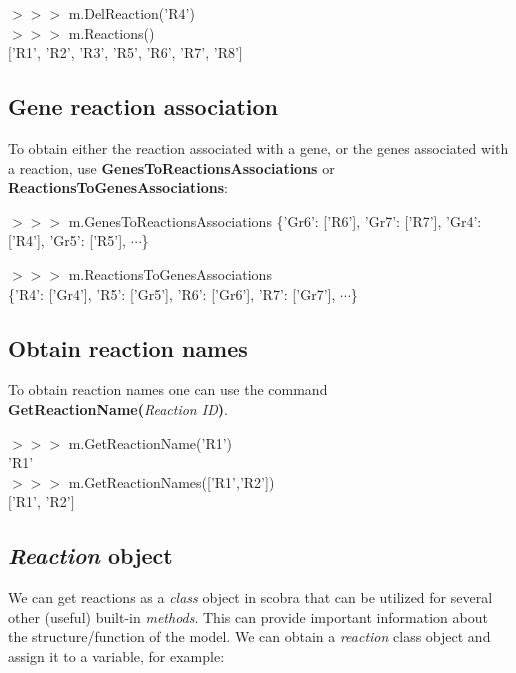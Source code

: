 \begin{framed}
$>>>$ m.DelReaction('R4')\\
$>>>$ m.Reactions()\\
$[$'R1', 'R2', 'R3', 'R5', 'R6', 'R7', 'R8'$]$
\end{framed}

\subsection{Gene reaction association}
To obtain either the reaction associated with a gene, or the genes associated with a reaction, use \textbf{GenesToReactionsAssociations} or \textbf{ReactionsToGenesAssociations}:

\begin{framed}
$>>>$ m.GenesToReactionsAssociations
\{'Gr6': ['R6'], 'Gr7': ['R7'], 'Gr4': ['R4'], 'Gr5': ['R5'], $\cdots$\}

$>>>$ m.ReactionsToGenesAssociations\\
\{'R4': ['Gr4'], 'R5': ['Gr5'], 'R6': ['Gr6'], 'R7': ['Gr7'], $\cdots$\}
\end{framed}


\subsection{Obtain reaction names}
To obtain reaction names one can use the command \textbf{GetReactionName(}\textit{Reaction ID}\textbf{)}.

\begin{framed}
$>>>$ m.GetReactionName('R1')\\
'R1'\\

$>>>$ m.GetReactionNames(['R1','R2'])\\
$[$'R1', 'R2'$]$
\end{framed}


\subsection{\textit{Reaction}  object}
We can get reactions as a \textit{class} object in scobra that can be utilized for several other (useful) built-in \textit{methods}. This can provide important information about the structure/function of the model. We can obtain a \textit{reaction} class object and assign it to a variable, for example:

